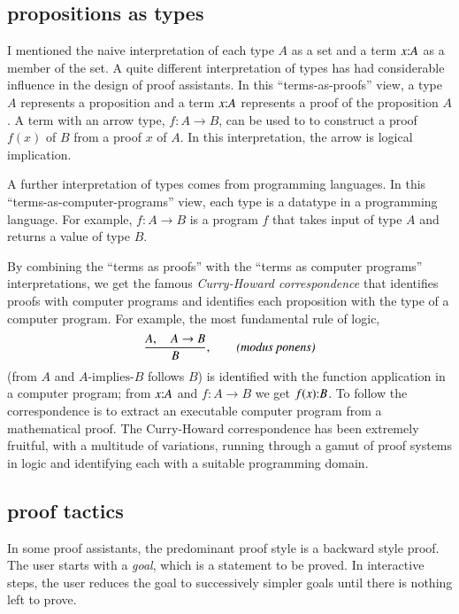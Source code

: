 \documentclass{llncs}
\def\tc{\hbox{:}}
\begin{document}
\subsection{propositions as types}

I mentioned the naive interpretation of each type $A$ as a
set and a term $x\tc A$ as a member of the set.  A quite different
interpretation of types has had considerable influence in the design
of proof assistants.  In this ``terms-as-proofs'' view, a type $A$ represents a
proposition and a term $x\tc A$ represents a proof of the proposition
$A$.  A term with an arrow type, $f:A\rightarrow B$, can be used to to
construct a proof $f(x)$ of $B$ from a proof $x$ of $A$.  In this
interpretation, the arrow is logical implication. 

A further interpretation of types comes from programming languages.
In this ``terms-as-computer-programs'' view, each type is a datatype
in a programming language.  For example,
$f:A\rightarrow B$ is a program $f$ that takes input of type
$A$ and returns a value of type $B$.

By combining the ``terms as proofs'' with the ``terms as computer
programs'' interpretations, we get the famous {\it Curry-Howard
  correspondence} that identifies proofs with computer programs and
identifies each proposition with the type of a computer program. 
For example,  the most fundamental rule of logic,
\[
\frac{A,\quad A\rightarrow B}{B},  \qquad \text{\it(modus ponens)}
\]
(from $A$ and $A\text{-implies-}B$ follows $B$) is identified with the
function application in a computer program; from $x\tc A$ and
$f:A\rightarrow B$ we get $f(x)\tc B$.  To follow the correspondence
is to extract an executable computer program from a mathematical
proof.  The Curry-Howard correspondence has been extremely fruitful,
with a multitude of variations, running through a gamut of proof
systems in logic and identifying each with a suitable programming
domain.






\subsection{proof tactics}

In some proof assistants, the predominant proof style is a backward style
proof.  The user starts with a {\it goal}, which is a statement to be proved. In
interactive steps, the user reduces the goal to successively
simpler goals until there is nothing left to prove.
\end{document}
